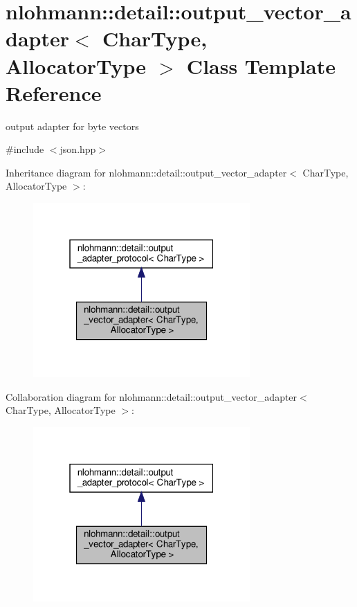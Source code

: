 \hypertarget{classnlohmann_1_1detail_1_1output__vector__adapter}{}\section{nlohmann\+:\+:detail\+:\+:output\+\_\+vector\+\_\+adapter$<$ Char\+Type, Allocator\+Type $>$ Class Template Reference}
\label{classnlohmann_1_1detail_1_1output__vector__adapter}


output adapter for byte vectors  




{\ttfamily \#include $<$json.\+hpp$>$}



Inheritance diagram for nlohmann\+:\+:detail\+:\+:output\+\_\+vector\+\_\+adapter$<$ Char\+Type, Allocator\+Type $>$\+:
\nopagebreak
\begin{figure}[H]
\begin{center}
\leavevmode
\includegraphics[width=235pt]{classnlohmann_1_1detail_1_1output__vector__adapter__inherit__graph}
\end{center}
\end{figure}


Collaboration diagram for nlohmann\+:\+:detail\+:\+:output\+\_\+vector\+\_\+adapter$<$ Char\+Type, Allocator\+Type $>$\+:
\nopagebreak
\begin{figure}[H]
\begin{center}
\leavevmode
\includegraphics[width=235pt]{classnlohmann_1_1detail_1_1output__vector__adapter__coll__graph}
\end{center}
\end{figure}
